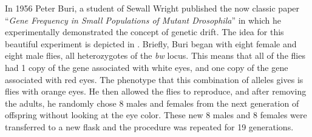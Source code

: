 In 1956 Peter Buri, a student of Sewall Wright published the now classic paper
``\textit{Gene Frequency in Small Populations of Mutant Drosophila}'' in which
he experimentally demonstrated the concept of genetic drift.  The idea for this
beautiful experiment is depicted in . Briefly, Buri
began with eight female and eight male flies, all heterozygotes of the
\textit{bw} locus. This means that all of the flies had 1 copy of the gene
associated with white eyes, and one copy of the gene associated with  red eyes.
The phenotype that this combination of alleles gives is flies with orange eyes.
He then allowed the flies to reproduce, and after removing the adults, he
randomly chose 8 males and females from the next generation of offspring
without looking at the eye color. These new 8 males and 8 females were
transferred to a new flask and the procedure was repeated for 19 generations.

